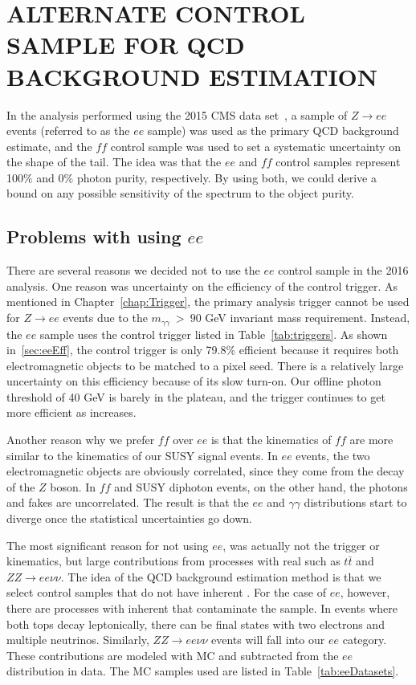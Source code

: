 \chapter{ALTERNATE CONTROL SAMPLE FOR QCD BACKGROUND ESTIMATION}
\label{app:ee}
In the analysis performed using the 2015 CMS data set~\cite{CMS:2015_anal}, 
a sample of $Z\rightarrow ee$ events (referred to as the $ee$ sample) was used as the 
primary QCD background estimate, and the $ff$ control 
sample was used to set a systematic uncertainty on the shape of the \ETmiss tail.
The idea was that the $ee$ and $ff$ control samples represent
100$\%$ and 0$\%$ photon purity, respectively. By using both, we could
derive a bound on any possible sensitivity of the \ETmiss spectrum
to the object purity. 

\section{Problems with using $ee$}
\label{sec:eeProblems}
There are several reasons we decided not to use the $ee$ control sample
 in the 2016 analysis. One reason was uncertainty on 
 the efficiency of the control 
 trigger. As mentioned in Chapter~\ref{chap:Trigger},
the primary analysis trigger 
cannot be used for $Z\rightarrow ee$ events due to the $m_{\gamma\gamma}~>~90$ GeV
invariant mass requirement. Instead, the $ee$ sample uses the control trigger 
listed in Table~\ref{tab:triggers}. As shown in~\ref{sec:eeEff}, the
control trigger is only 79.8\% efficient because it 
requires both electromagnetic objects to be matched to a 
pixel seed. There is a relatively 
large uncertainty on this efficiency because of its
slow turn-on. Our offline photon \pT threshold of 40 GeV is 
barely in the plateau, and the trigger continues to get more efficient 
as \pT increases. 

Another reason why we prefer $ff$ over $ee$ is that the kinematics
of $ff$ are more similar to the kinematics of our SUSY signal events.
In $ee$ events, the two electromagnetic objects are obviously correlated, 
since they come from the decay of the $Z$ boson. In $ff$ and SUSY diphoton
events, on the other hand, the photons and fakes are uncorrelated. The result
is that the $ee$ and $\gamma\gamma$ \ETmiss distributions start to diverge
once the statistical uncertainties go down. 

The most significant reason for not using $ee$, was actually 
not the trigger or kinematics, but large contributions from processes with real \ETmiss 
 such as $t\bar{t}$ and $ZZ\rightarrow ee\nu\nu$. 
The idea of the QCD background estimation method is that we 
select control samples that do not have inherent \ETmiss. 
For the case of $ee$, however,
there are processes with inherent \ETmiss that contaminate
the sample. 
In \ttbar events where both tops decay leptonically,
there can be final states with two electrons and
multiple neutrinos. Similarly, $ZZ \rightarrow ee\nu\nu$
events will fall into our $ee$ category.
These contributions are modeled with MC and subtracted 
from the $ee$ distribution in data. 
The MC samples used are listed in
Table~\ref{tab:eeDatasets}.

